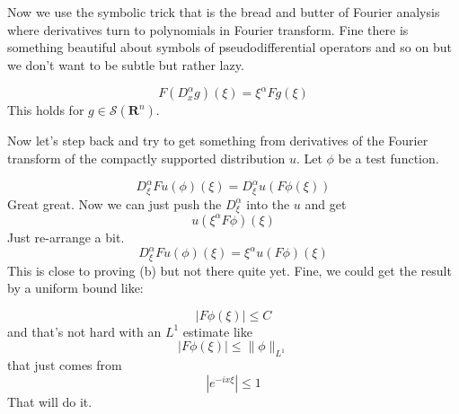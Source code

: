 \documentclass{amsart}
\begin{document}
Now we use the symbolic trick that is the bread and butter of Fourier analysis where derivatives turn to polynomials in Fourier transform.  Fine there is something beautiful about symbols of pseudodifferential operators and so on but we don't want to be subtle but rather lazy.

\[
F(D_x^{\alpha} g)(\xi) = \xi^{\alpha} Fg(\xi)
\]
This holds for $g \in \mathcal{S}(\mathbf{R}^n)$.

Now let's step back and try to get something from derivatives of the Fourier transform of the compactly supported distribution $u$.  Let $\phi$ be a test function.

\[
D_{\xi}^{\alpha} Fu(\phi)(\xi) = D_{\xi}^{\alpha} u( F\phi(\xi) )
\]
Great great.  Now we can just push the $D_{\xi}^{\alpha}$ into the $u$ and get
\[
 u( \xi^{\alpha} F\phi) (\xi)
\]
Just re-arrange a bit.
\[
D_{\xi}^{\alpha} Fu(\phi)(\xi) = \xi^{\alpha} u( F\phi) (\xi)
\]
This is close to proving (b) but not there quite yet.  Fine, we could get the result by a uniform bound like:

\[
| F\phi(\xi) | \le C
\]
and that's not hard with an $L^1$ estimate like
\[
| F\phi(\xi) | \le \| \phi \|_{L^1}
\]
that just comes from 
\[
|e^{-i x \xi} | \le 1
\]
That will do it.
\end{document}
